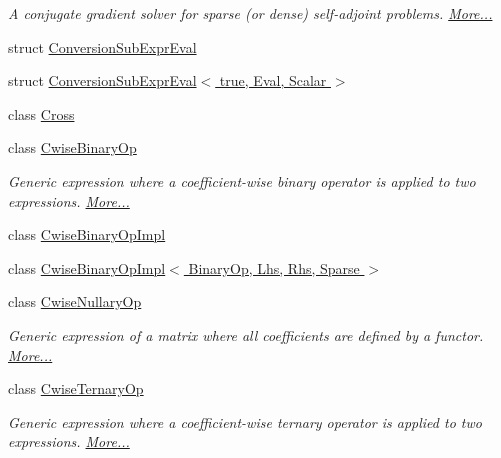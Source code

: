 \begin{DoxyCompactItemize}
\begin{DoxyCompactList}\small\item\em A conjugate gradient solver for sparse (or dense) self-\/adjoint problems.  \hyperlink{group___iterative_linear_solvers___module_class_eigen_1_1_conjugate_gradient}{More...}\end{DoxyCompactList}\item 
struct \hyperlink{struct_eigen_1_1_conversion_sub_expr_eval}{Conversion\+Sub\+Expr\+Eval}
\item 
struct \hyperlink{struct_eigen_1_1_conversion_sub_expr_eval_3_01true_00_01_eval_00_01_scalar_01_4}{Conversion\+Sub\+Expr\+Eval$<$ true, Eval, Scalar $>$}
\item 
class \hyperlink{class_eigen_1_1_cross}{Cross}
\item 
class \hyperlink{group___core___module_class_eigen_1_1_cwise_binary_op}{Cwise\+Binary\+Op}
\begin{DoxyCompactList}\small\item\em Generic expression where a coefficient-\/wise binary operator is applied to two expressions.  \hyperlink{group___core___module_class_eigen_1_1_cwise_binary_op}{More...}\end{DoxyCompactList}\item 
class \hyperlink{class_eigen_1_1_cwise_binary_op_impl}{Cwise\+Binary\+Op\+Impl}
\item 
class \hyperlink{class_eigen_1_1_cwise_binary_op_impl_3_01_binary_op_00_01_lhs_00_01_rhs_00_01_sparse_01_4}{Cwise\+Binary\+Op\+Impl$<$ Binary\+Op, Lhs, Rhs, Sparse $>$}
\item 
class \hyperlink{group___core___module_class_eigen_1_1_cwise_nullary_op}{Cwise\+Nullary\+Op}
\begin{DoxyCompactList}\small\item\em Generic expression of a matrix where all coefficients are defined by a functor.  \hyperlink{group___core___module_class_eigen_1_1_cwise_nullary_op}{More...}\end{DoxyCompactList}\item 
class \hyperlink{group___core___module_class_eigen_1_1_cwise_ternary_op}{Cwise\+Ternary\+Op}
\begin{DoxyCompactList}\small\item\em Generic expression where a coefficient-\/wise ternary operator is applied to two expressions.  \hyperlink{group___core___module_class_eigen_1_1_cwise_ternary_op}{More...}\end{DoxyCompactList}\item 

\end{DoxyCompactItemize}
